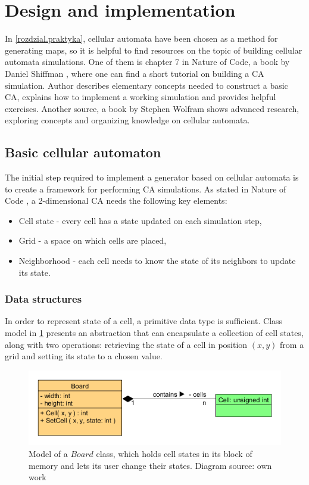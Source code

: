 \documentclass[12pt]{report}
\begin{document}
\section{Design and implementation} 

In \cref{rozdzial.praktyka}, cellular automata have been chosen as a method for generating maps, so it is helpful to find resources on the topic of building cellular automata simulations. One of them is chapter 7 in Nature of Code, a book by Daniel Shiffman \autocite{shiffman2012nature}, where one can find a short tutorial on building a CA simulation. Author describes elementary concepts needed to construct a basic CA, explains how to implement a working simulation and provides helpful exercises. Another source, a book by Stephen Wolfram  \autocite{wolfram2002new} shows advanced research, exploring concepts and organizing knowledge on cellular automata.

\subsection{Basic cellular automaton}

The initial step required to implement a generator based on cellular automata is to create a framework for performing CA simulations. As stated in Nature of Code \autocite{shiffman2012nature}, a 2-dimensional CA needs the following key elements:

\begin{itemize}
	\item Cell state - every cell has a state updated on each simulation step,
	\item Grid - a space on which cells are placed,
	\item Neighborhood - each cell needs to know the state of its neighbors to update its state.
\end{itemize}

\subsubsection{Data structures}
In order to represent state of a cell, a primitive data type is sufficient. Class model in \cref{fig:boardcell} presents an abstraction that can encapsulate a collection of cell states, along with two operations: retrieving the state of a cell in position $(x,y)$ from a grid and setting its state to a chosen value. 

\begin{figure}[H]
	\centering
	\includegraphics[width=0.8\linewidth]{diagrams/boardcell01}
	\caption{ Model of a $Board$ class, which holds cell states in its block of memory and lets its user change their states. Diagram source: own work} 
	\label{fig:boardcell}
\end{figure}
\end{document}
